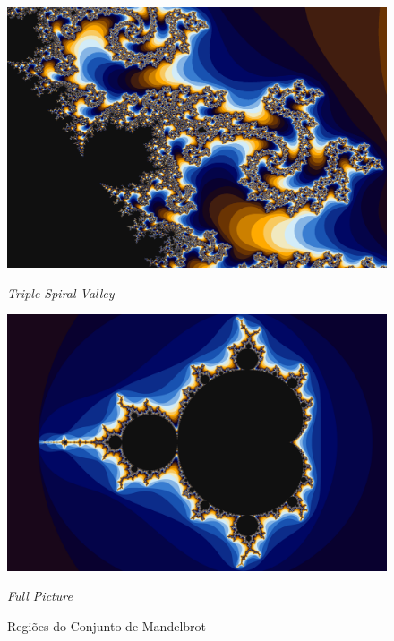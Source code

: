 \documentclass[final,12pt,a4paper]{elsarticle}
\begin{document}
\begin{figure}[htpb]
    \begin{minipage}{.48\textwidth}
    \centering
        \includegraphics[width=.95\textwidth]{triple_spiral}
    \caption{\textit{Triple Spiral Valley}}
    \label{fig:regions}
    \end{minipage}%
    \begin{minipage}{.48\textwidth}
    \centering
        \includegraphics[width=.95\textwidth]{full}
    \caption{\textit{Full Picture}}
    \label{fig:regions}
    \end{minipage}

    \captionsetup{width=\linewidth}
    \caption{Regiões do Conjunto de Mandelbrot}
    \label{fig:regions}
\end{figure}
\end{document}
